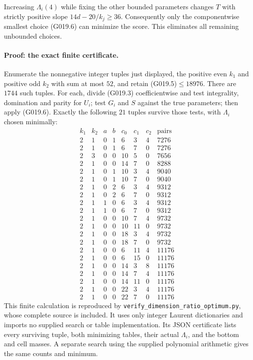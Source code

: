 Increasing $\Lambda_i(4)$ while fixing the other bounded
parameters changes $T$ with strictly positive slope
$14d-20/k_j\ge36$. Consequently only the componentwise
smallest choice (G019.6) can minimize the score. This
eliminates all remaining unbounded choices.

\paragraph{Proof: the exact finite certificate.}
Enumerate the nonnegative integer tuples just displayed,
the positive even $k_1$ and positive odd $k_2$ with sum
at most $52$, and retain (G019.5)$\le18976$. There are
$1744$ such tuples. For each, divide (G019.3) coefficientwise
and test integrality, domination and parity for $U_i$;
test $G_i$ and $S$ against the true parameters; then apply
(G019.6). Exactly the following $21$ tuples survive those
tests, with $\Lambda_i$ chosen minimally:
\[
\begin{array}{rr|rr|rrr|r}
k_1&k_2&a&b&c_0&c_1&c_2&\text{pairs}\\\hline
2&1&0&1&6&3&4&7276\\
2&1&0&1&6&7&0&7276\\
2&3&0&0&10&5&0&7656\\
2&1&0&0&14&7&0&8288\\
2&1&0&1&10&3&4&9040\\
2&1&0&1&10&7&0&9040\\
2&1&0&2&6&3&4&9312\\
2&1&0&2&6&7&0&9312\\
2&1&1&0&6&3&4&9312\\
2&1&1&0&6&7&0&9312\\
2&1&0&0&10&7&4&9732\\
2&1&0&0&10&11&0&9732\\
2&1&0&0&18&3&4&9732\\
2&1&0&0&18&7&0&9732\\
2&1&0&0&6&11&4&11176\\
2&1&0&0&6&15&0&11176\\
2&1&0&0&14&3&8&11176\\
2&1&0&0&14&7&4&11176\\
2&1&0&0&14&11&0&11176\\
2&1&0&0&22&3&4&11176\\
2&1&0&0&22&7&0&11176
\end{array}
\]
This finite calculation is reproduced by
\texttt{verify\_dimension\_ratio\_optimum.py}, whose complete
source is included. It uses only integer Laurent dictionaries
and imports no supplied search or table implementation. Its
JSON certificate lists every surviving tuple, both minimizing
tables, their actual $\Lambda_i$, and the bottom and cell
masses. A separate search using the supplied polynomial
arithmetic gives the same counts and minimum.

